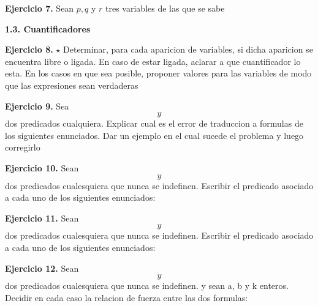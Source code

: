 \documentclass[12pt]{report}
\begin{document}
\vspace{0.8cm}
\textbf{Ejercicio 7.} Sean $p,q$ y $r$ tres variables de las que se sabe
\vspace{0.8cm}


\textbf{1.3. Cuantificadores}

\vspace{0.8cm}
\textbf{Ejercicio 8.} $\star$ Determinar, para cada aparicion de variables, si dicha aparicion se encuentra libre o ligada. En caso de estar ligada, aclarar
a que cuantificador lo esta. En los casos en que sea posible, proponer valores para las variables
de modo que las expresiones sean verdaderas
\vspace{0.8cm}


\vspace{0.8cm}
\textbf{Ejercicio 9.} Sea $$ y $$ dos predicados cualquiera. Explicar cual es el error
de traduccion a formulas de los siguientes enunciados. Dar un ejemplo en el cual sucede el problema 
y luego corregirlo
\vspace{0.8cm}


\vspace{0.8cm}
\textbf{Ejercicio 10.} Sean $$ y $$ dos predicados cualesquiera que nunca se indefinen.
Escribir el predicado asociado a cada uno de los siguientes enunciados:  
\vspace{0.8cm}


\vspace{0.8cm}
\textbf{Ejercicio 11.} Sean $$ y $$ dos predicados cualesquiera que nunca se indefinen.
Escribir el predicado asociado a cada uno de los siguientes enunciados:
\vspace{0.8cm}

\vspace{0.8cm}
\textbf{Ejercicio 12.} Sean $$ y $$ dos predicados cualesquiera que nunca se indefinen.
y sean a, b y k enteros. Decidir en cada caso la relacion de fuerza entre las dos formulas:
\vspace{0.8cm}
\end{document}
